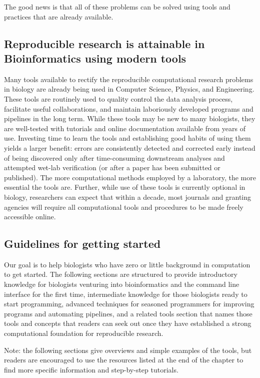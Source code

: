 \documentclass[ChapterTOCs,krantz2]{krantz} %
\begin{document}
The good news is that
all of these problems can be solved using tools 
and practices that are already available.  

\subsection{Reproducible research is attainable in Bioinformatics using modern tools}

Many tools available to rectify the reproducible computational research problems 
in biology are already being used in Computer Science, Physics, and
Engineering.  These
tools are routinely used to quality control the data analysis process,
facilitate useful collaborations, and maintain laboriously developed programs
and pipelines in the long term.  While these tools may be new to many
biologists, they are well-tested with tutorials and online
documentation available from years of use.  Investing time to learn the
tools and establishing good habits of using them yields a larger benefit:
errors are consistently detected and corrected early instead of being
discovered only after time-consuming downstream analyses and attempted wet-lab
verification (or after a paper has been submitted or published\cite{Miller2006}).  The more
computational methods employed by a laboratory, the more essential the tools
are.  Further, while 
use of these tools is currently optional in biology\cite{Ince2012}, researchers can 
expect that within a decade, most journals and granting agencies will 
require all computational tools and procedures to be made freely accessible online.

\subsection{Guidelines for getting started} Our goal is to help biologists who
have zero or little background in computation to
get started. The following sections are structured to provide
introductory knowledge for biologists venturing into bioinformatics and the
command line interface for the first time, intermediate knowledge for those
biologists ready to start programming, advanced techniques for seasoned
programmers for improving programs and automating pipelines, and a related tools
section that names those tools and concepts that readers can seek out once they
have established a strong computational foundation for reproducible research.

Note: the following sections give overviews and simple examples of the tools, 
but readers are encouraged to use the resources listed at the end of
the chapter to find more specific information and step-by-step tutorials.
\end{document}
